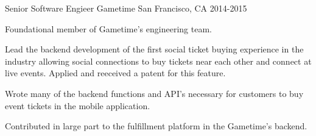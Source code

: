 \begin{cventries}
  \cventry
    {Senior Software Engieer} %
    {Gametime} %
    {San Francisco, CA} %
    {2014-2015} %
    {
      \begin{cvitems} %
        \item {Foundational member of Gametime's engineering team.}
        \item {Lead the backend development of the first social ticket buying experience in the industry allowing social connections to buy tickets near each other and connect at live events. Applied and reeceived a patent for this feature.}
        \item {Wrote many of the backend functions and API's necessary for customers to buy event tickets in the mobile application.}
        \item {Contributed in large part to the fulfillment platform in the Gametime's backend.}
      \end{cvitems}
    }

\end{cventries}
